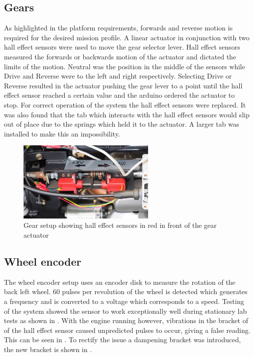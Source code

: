 \documentclass[main.tex]{subfiles}
\begin{document}
\subsection{Gears}
As highlighted in the platform requirements, forwards and reverse motion is required for the desired mission profile. A linear actuator in conjunction with two hall effect sensors were used to move the gear selector lever. Hall effect sensors measured the forwards or backwards motion of the actuator and dictated the limits of the motion. Neutral was the position in the middle of the sensors while Drive and Reverse were to the left and right respectively. Selecting Drive or Reverse resulted in the actuator pushing the gear lever to a point until the hall effect sensor reached a certain value and the arduino ordered the actuator to stop. For correct operation of the system the hall effect sensors were replaced. It was also found that the tab which interacts with the hall effect sensors would slip out of place due to the springs which held it to the actuator. A larger tab was installed to make this an impossibility.
\begin{figure}[ht]
\includegraphics[width=0.6\textwidth]{4-DetailedDesign/gearSetup.JPG}
\centering
\caption{Gear setup showing hall effect sensors in red in front of the gear actuator} 
\end{figure}

\subsection{Wheel encoder}
The wheel encoder setup uses an encoder disk to measure the rotation of the back left wheel. 60 pulses per revolution of the wheel is detected which generates a frequency and is converted to a voltage which corresponds to a speed. Testing of the system showed the sensor to work exceptionally well during stationary lab tests as shown in . With the engine running however, vibrations in the bracket of of the hall effect sensor caused unpredicted pulses to occur, giving a false reading. This can be seen in . To rectify the issue a dampening bracket was introduced, the new bracket is shown in .
\end{document}
